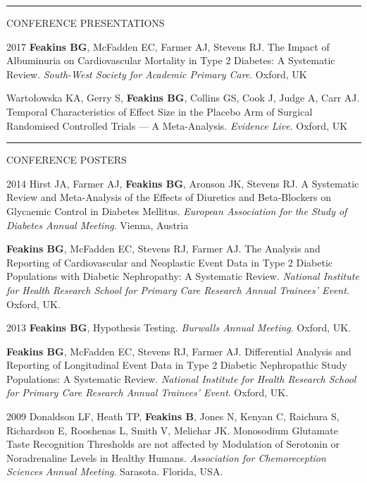 \documentclass[10pt,a4paper]{article}
\begin{document}
\noindent\rule{\textwidth}{0.4pt}
\begin{cvlist}{CONFERENCE PRESENTATIONS}
  
  \item[2017]
  \textbf{Feakins BG}, McFadden EC, Farmer AJ, Stevens RJ. The Impact of Albuminuria on Cardiovascular Mortality in Type 2 Diabetes: A Systematic Review. \textit{South-West Society for Academic Primary Care}. Oxford, UK
  
  \item[]
  Warto\l{}owska KA, Gerry S, \textbf{Feakins BG}, Collins GS, Cook J, Judge A, Carr AJ. Temporal Characteristics of Effect Size in the Placebo Arm of Surgical Randomised Controlled Trials --- A Meta-Analysis. \textit{Evidence Live}. Oxford, UK
  
\end{cvlist}


\noindent\rule{\textwidth}{0.4pt}
\begin{cvlist}{CONFERENCE POSTERS}
  
  \item[2014]
  Hirst JA, Farmer AJ, \textbf{Feakins BG}, Aronson JK, Stevens RJ. A Systematic Review and Meta-Analysis of the Effects of Diuretics and Beta-Blockers on Glycaemic Control in Diabetes Mellitus. \textit{European Association for the Study of Diabetes Annual Meeting}. Vienna, Austria
  
  \item[]
  \textbf{Feakins BG}, McFadden EC, Stevens RJ, Farmer AJ. The Analysis and Reporting of Cardiovascular and Neoplastic Event Data in Type 2 Diabetic Populations with Diabetic Nephropathy: A Systematic Review. \textit{National Institute for Health Research School for Primary Care Research Annual Trainees' Event}. Oxford, UK.
  
  \item[2013]
  \textbf{Feakins BG}, Hypothesis Testing. \textit{Burwalls Annual Meeting}. Oxford, UK.
  
  \item[]
  \textbf{Feakins BG}, McFadden EC, Stevens RJ, Farmer AJ. Differential Analysis and Reporting of Longitudinal Event Data in Type 2 Diabetic Nephropathic Study Populations: A Systematic Review. \textit{National Institute for Health Research School for Primary Care Research Annual Trainees' Event}. Oxford, UK.
  
  \item[2009]
  Donaldson LF, Heath TP, \textbf{Feakins B}, Jones N, Kenyan C, Raichura S, Richardson E, Rooshenas L, Smith V, Melichar JK. Monosodium Glutamate Taste Recognition Thresholds are not affected by Modulation of Serotonin or Noradrenaline Levels in Healthy Humans. \textit{Association for Chemoreception Sciences Annual Meeting}. Sarasota. Florida, USA.
  
\end{cvlist}
\end{document}
